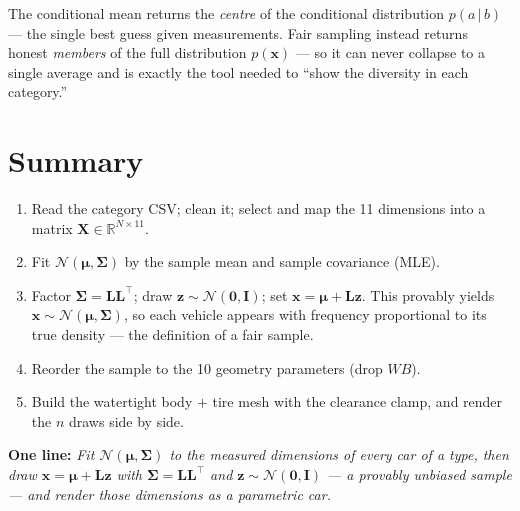 \documentclass[11pt]{article}
\newcommand{\WB}{\mathit{WB}}
\newcommand{\given}{\,\vert\,}
\newcommand{\Norm}{\mathcal{N}}
\newcommand{\bmu}{\boldsymbol{\mu}}
\newcommand{\bSigma}{\boldsymbol{\Sigma}}
\newcommand{\bx}{\mathbf{x}}
\newcommand{\bz}{\mathbf{z}}
\newcommand{\bX}{\mathbf{X}}
\newcommand{\Lmat}{\mathbf{L}}
\newcommand{\Imat}{\mathbf{I}}
\newcommand{\T}{^{\!\top}}
\theoremstyle{definition}
\begin{document}
\noindent The conditional mean returns the \emph{centre} of the conditional distribution $p(a\given b)$ --- the single best guess given measurements. Fair sampling instead returns honest \emph{members} of the full distribution $p(\bx)$ --- so it can never collapse to a single average and is exactly the tool needed to ``show the diversity in each category.''

\section{Summary}

\begin{enumerate}[leftmargin=2em]
  \item Read the category CSV; clean it; select and map the 11 dimensions into a matrix $\bX\in\mathbb{R}^{N\times11}$.
  \item Fit $\Norm(\bmu,\bSigma)$ by the sample mean and sample covariance (MLE).
  \item Factor $\bSigma=\Lmat\Lmat\T$; draw $\bz\sim\Norm(\mathbf0,\Imat)$; set $\bx=\bmu+\Lmat\bz$. This provably yields $\bx\sim\Norm(\bmu,\bSigma)$, so each vehicle appears with frequency proportional to its true density --- the definition of a fair sample.
  \item Reorder the sample to the 10 geometry parameters (drop $\WB$).
  \item Build the watertight body $+$ tire mesh with the clearance clamp, and render the $n$ draws side by side.
\end{enumerate}

\noindent\textbf{One line:} \emph{Fit $\Norm(\bmu,\bSigma)$ to the measured dimensions of every car of a type, then draw $\bx=\bmu+\Lmat\bz$ with $\bSigma=\Lmat\Lmat\T$ and $\bz\sim\Norm(\mathbf0,\Imat)$ --- a provably unbiased sample --- and render those dimensions as a parametric car.}
\end{document}
